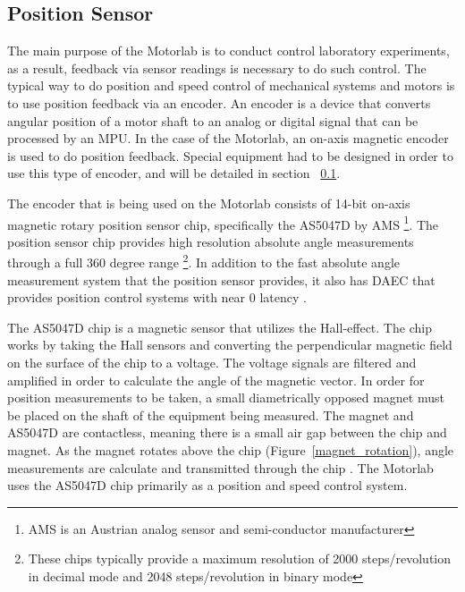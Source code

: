\subsection{Position Sensor}
\label{makereference2.1.2} 

The main purpose of the Motorlab is to conduct control laboratory experiments, as a result, feedback via sensor readings is necessary to do such control. The typical way to do position and speed control of mechanical systems and motors is to use position feedback via an encoder. An encoder is a device that converts angular position of a motor shaft to an analog or digital signal that can be processed by an MPU. In the case of the Motorlab, an on-axis magnetic encoder is used to do position feedback. Special equipment had to be designed in order to use this type of encoder, and will be detailed in section ~\ref{makereference2.1.2}.  

The encoder that is being used on the Motorlab consists of 14-bit on-axis magnetic rotary position sensor chip, specifically the AS5047D by AMS \footnote{AMS is an Austrian analog sensor and semi-conductor manufacturer}. The position sensor chip provides high resolution absolute angle measurements through a full 360 degree range \footnote{These chips typically provide a maximum resolution of 2000 steps/revolution in decimal mode and 2048 steps/revolution in binary mode}. In addition to the fast absolute angle measurement system that the position sensor provides, it also has \ac{DAEC} that provides position control systems with near 0 latency \citep{1}.  

The AS5047D chip is a magnetic sensor that utilizes the Hall-effect. The chip works by taking the Hall sensors and converting the perpendicular magnetic field on the surface of the chip to a voltage. The voltage signals are filtered and amplified in order to calculate the angle of the magnetic vector. In order for position measurements to be taken, a small diametrically opposed magnet must be placed on the shaft of the equipment being measured. The magnet and AS5047D are contactless, meaning there is a small air gap between the chip and magnet. As the magnet rotates above the chip (Figure~\ref{magnet_rotation}), angle measurements are calculate and transmitted through the chip \citep{1}. The Motorlab uses the AS5047D chip primarily as a position and speed control system. 

